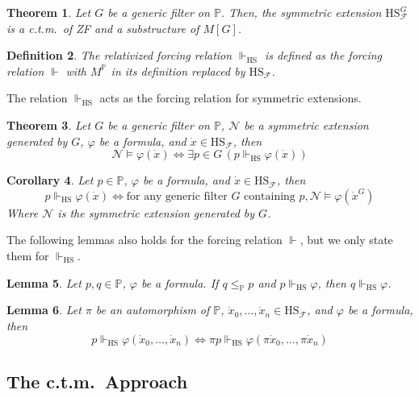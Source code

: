 \documentclass{report}
\newtheorem{thm}{Theorem}[section]
\newtheorem{lem}[thm]{Lemma}
\newtheorem{dfn}[thm]{Definition}
\newtheorem{cor}[thm]{Corollary}
\newcommand{\Pbb}{\mathbb{P}}
\newcommand{\Fcal}{\mathcal{F}}
\newcommand{\Ncal}{\mathcal{N}}
\newcommand{\ctm}{c.t.m.\ }
\begin{document}
\begin{thm}
  Let $G$ be a generic filter on $\Pbb$. Then, the symmetric extension $\mathrm{HS}^{G}_{\Fcal}$ is a \ctm of ZF and a substructure of $M[G]$.
\end{thm}

\begin{dfn}
  The relativized forcing relation $\Vdash_{\mathrm{HS}}$ is defined as the forcing relation $\Vdash$ with $M^{\Pbb}$ in its definition replaced by $\mathrm{HS}_{\Fcal}$.
\end{dfn}

The relation $\Vdash_{\mathrm{HS}}$ acts as the forcing relation for symmetric extensions.

\begin{thm}\label{thm:symmetry_main_thm}
  Let $G$ be a generic filter on $\Pbb$, $\Ncal$ be a symmetric extension generated by $G$, $\varphi$ be a formula, and $\dot{x} \in \mathrm{HS}_{\Fcal}$, then
  $$\Ncal \vDash \varphi(\dot{x}) \Leftrightarrow \exists p \in G \, (p \Vdash_{\mathrm{HS}} \varphi(\dot{x}))$$
\end{thm}

\begin{cor}\label{cor:symmetry_main_cor}
  Let $p \in \Pbb$, $\varphi$ be a formula, and $\dot{x} \in \mathrm{HS}_{\Fcal}$, then
  $$p \Vdash_{\mathrm{HS}} \varphi(\dot{x}) \Leftrightarrow \text{for any generic filter } G \text{ containing } p, \Ncal \vDash \varphi(\dot{x}^G)$$
  Where $\Ncal$ is the symmetric extension generated by $G$.
\end{cor}

The following lemmas also holds for the forcing relation $\Vdash$, but we only state them for $\Vdash_{\mathrm{HS}}$.

\begin{lem}\label{lem:strengthening}
  Let $p, q \in \Pbb$, $\varphi$ be a formula. If $q \leq_{\Pbb} p$ and $p \Vdash_{\mathrm{HS}} \varphi$, then $q \Vdash_{\mathrm{HS}} \varphi$.
\end{lem}

\begin{lem}\label{lem:symmetry_lemma}
  Let $\pi$ be an automorphism of $\Pbb$, $\dot{x}_0, \ldots, \dot{x}_n \in \mathrm{HS}_{\Fcal}$, and $\varphi$ be a formula, then
  $$p \Vdash_{\mathrm{HS}} \varphi(\dot{x}_0, \ldots, \dot{x}_n) \Leftrightarrow \pi p \Vdash_{\mathrm{HS}} \varphi(\pi \dot{x}_0, \ldots, \pi \dot{x}_n)$$
\end{lem}

\subsection{The \ctm Approach}\label{subsection:ctm}
\end{document}
